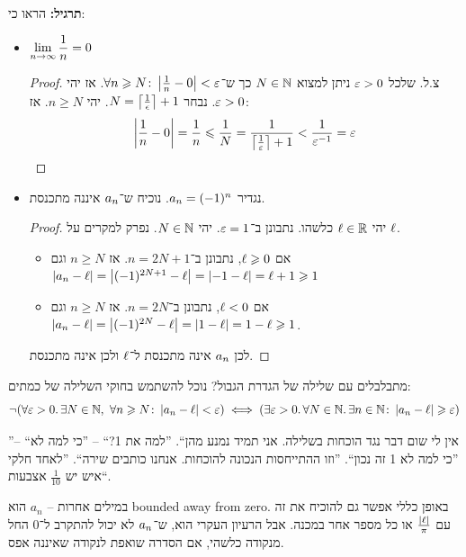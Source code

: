 \documentclass[name=רשימות חשבון דיפרנציאלי ואינטגרלי 1א]{../../../tex/classes/megasumPreamble}
\begin{document}
	\textbf{תרגיל: }הראו כי:
	\begin{itemize}
		\item \hfil $\displaystyle\limsi \frac{1}{n} = 0$
		\begin{proof}
			צ.ל. שלכל $\eg > 0$ ניתן למצוא $N \in \N$ כך ש־$\forall n \ge N \co \sof{\frac{1}{n} - 0} < \eg$. אז יהי $\eg > 0$. נבחר $N = \ceil{\frac{1}{\epsi}} + 1$. יהי $n \ge N$. אז:
			\[ \sof{\frac{1}{n}  - 0} = \frac{1}{n} \le \frac{1}{N} = \frac{1}{\ceil{\frac{1}{\eg}} + 1} < \frac{1}{\eg\op} = \eg \]
		\end{proof}
		\item נגדיר $\an = (-1)^{n}$. נוכיח ש־$\an$ איננה מתכנסת. \begin{proof}
			יהי $\ml \in \R$ כלשהו. נתבונן ב־$\eg = 1$. יהי $N \in \N$. נפרק למקרים על $\ml$.
			\begin{itemize}
				\item אם $\ml \ge 0$, נתבונן ב־$n = 2N + 1$. אז $n \ge N$ וגם $\sof{a_n - \ml} = \sof{(-1)^{2N + 1} - \ml} = \sof{-1 - \ml}= \ml + 1 \ge 1$
				\item אם $\ml < 0$, נתבונן ב־$n = 2N$. אז $n \ge N$ וגם $\sof{a_n - \ml} = \sof{(-1)^{2N} - \ml} = \sof{1 - \ml} =1 - \ml \ge 1$.
			\end{itemize}
			לכן $\an$ אינה מתכנסת ל־$\ml$ ולכן אינה מתכנסת.
		\end{proof}
	\end{itemize}

	מתבלבלים עם שלילה של הגדרת הגבול? נוכל להשתמש בחוקי השלילה של כמתים:
	\[ \lnot(\forall \eg > 0.\, \exists N \in \N,\ \forall n \ge N \co \sof{a_n - \ml} < \eg) \iff (\exists \eg > 0.\,\forall N \in \N.\,\exists n \in \N \co \sof{a_n - \ml} \ge \eg) \]

	''אין לי שום דבר נגד הוכחות בשלילה. אני תמיד נמנע מהן``. ''למה את 1?`` -- ''כי למה לא`` -- ''כי למה לא 1 זה נכון``. ''וזו ההתייחסות הנכונה להוכחות. אנחנו כותבים שירה``. ''לאחד חלקי איש יש $\frac{1}{10}$ אצבעות``.

	במילים אחרות – $a_n$ הוא bounded away from zero. באופן כללי אפשר גם להוכיח את זה עם $\frac{\sof{\ml}}{\pi}$ או כל מספר אחר במכנה. אבל הרעיון העקרי הוא, ש־$\an$ לא יכול להתקרב ל־$0$ החל מנקודה כלשהי, אם הסדרה שואפת לנקודה שאיננה אפס.
\end{document}
